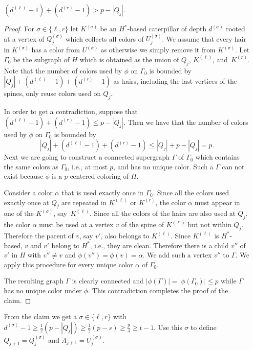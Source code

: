 \begin{klaim}\label{lem:h1+h2}
  $(d^{(\ell)}-1)+(d^{(r)}-1) > p - |Q_j|$.
\end{klaim}
\begin{proof}
  For $\sigma\in\{\ell,r\}$ let $K^{(\sigma)}$ be an $H^*$-based caterpillar of depth $d^{(\sigma)}$
  rooted at a vertex of $Q_j^{(\sigma)}$ which collects all colors of
  $U_j^{(\bar{\sigma})}$.  
  We assume that every hair in $K^{(\sigma)}$ has a color from $U^{(\bar{\sigma})}$ as 
  otherwise  we simply remove it from $K^{(\sigma)}$.
  Let $\Gamma_0$ be the subgraph of $H$ which is obtained
  as the union of $Q_j$, $K^{(\ell)}$, and~$K^{(r)}$.
  Note that the number of colors used by $\phi$ on $\Gamma_0$ is bounded 
  by $|Q_j| + (d^{(\ell)}-1) + (d^{(r)}-1)$ as hairs, including the last vertices of the spines, 
  only reuse colors used on $Q_j$.

  In order to get a contradiction, suppose that $(d^{(\ell)}-1)+(d^{(r)}-1)\leq p - |Q_j|$. 
  Then we have that the number of colors used by $\phi$ on $\Gamma_0$ is bounded by 
\[
|Q_j| + (d^{(\ell)}-1) + (d^{(r)}-1) \leq |Q_j| + p - |Q_j| = p.
\]
  Next we are going to construct a connected supergraph $\Gamma$ of
  $\Gamma_0$ which contains the same colors as $\Gamma_0$, i.e., at
  most $p$, and has no unique color. Such a $\Gamma$ can not exist
  because $\phi$ is a $p$-centered coloring of $H$.

  Consider a color $\alpha$ that is used exactly once in $\Gamma_0$.
  Since all the colors used exactly once at $Q_j$ are repeated in $K^{(\ell)}$ or $K^{(r)}$,
  the color $\alpha$ must appear in one of the $K^{(\sigma)}$, say~$K^{(\ell)}$.
  Since all the colors of the hairs are also used at $Q_j$, the color $\alpha$
  must be used at a vertex $v$ of the spine of $K^{(\ell)}$ but not within $Q_j$.
  Therefore the parent of $v$, say $v'$, also belongs to $K^{(\ell)}$.
  Since $K^{(\ell)}$ is $H^*$-based, $v$ and $v'$ belong to $H^*$, i.e., they are clean.
  Therefore there is a child $v''$ of $v'$ in $H$ with $v''\neq v$ and $\phi(v'')=\phi(v)=\alpha$.
  We add such a vertex $v''$ to $\Gamma$.
  We apply this procedure for every unique color $\alpha$ of $\Gamma_0$.
  
  The resulting graph $\Gamma$ is clearly connected and $|\phi(\Gamma)| = |\phi(\Gamma_0)|\leq p$ 
  while $\Gamma$ has no unique color under $\phi$.
  This contradiction completes the proof of the claim.
\end{proof}

{}From the claim we get a  $\sigma\in\{\ell,r\}$ with
$d^{(\sigma)} -1 \geq \frac{1}{2}(p-|Q_j|) \geq \frac{1}{2}(p - s) \geq \frac{p}{4} \geq t-1$.
Use this $\sigma$ to define $Q_{j+1}= Q_j^{(\sigma)}$ and $A_{j+1} = U_j^{(\bar{\sigma})}$.

